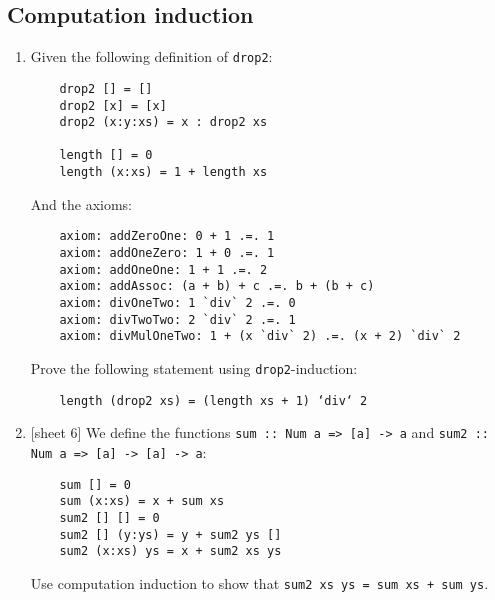 \documentclass{article}
\def\code#1{\texttt{#1}}
\begin{document}
\subsection{Computation induction}
\begin{enumerate}
    \item Given the following definition of \code{drop2}:
        \begin{verbatim}
    drop2 [] = []
    drop2 [x] = [x]
    drop2 (x:y:xs) = x : drop2 xs

    length [] = 0
    length (x:xs) = 1 + length xs
        \end{verbatim}
        And the axioms:
        \begin{verbatim}
    axiom: addZeroOne: 0 + 1 .=. 1
    axiom: addOneZero: 1 + 0 .=. 1
    axiom: addOneOne: 1 + 1 .=. 2
    axiom: addAssoc: (a + b) + c .=. b + (b + c)
    axiom: divOneTwo: 1 `div` 2 .=. 0
    axiom: divTwoTwo: 2 `div` 2 .=. 1
    axiom: divMulOneTwo: 1 + (x `div` 2) .=. (x + 2) `div` 2
        \end{verbatim}
        Prove the following statement using \code{drop2}-induction:
        \begin{verbatim}
    length (drop2 xs) = (length xs + 1) ‘div‘ 2
        \end{verbatim}

    \item {[sheet 6]} We define the functions \code{sum :: Num a => [a] -> a} and \code{sum2 :: Num a => [a] -> [a] -> a}:
        \begin{verbatim}
    sum [] = 0
    sum (x:xs) = x + sum xs
    sum2 [] [] = 0
    sum2 [] (y:ys) = y + sum2 ys []
    sum2 (x:xs) ys = x + sum2 xs ys
        \end{verbatim}
        Use computation induction to show that \code{sum2 xs ys = sum xs + sum ys}.
\end{enumerate}

\printbibliography
\end{document}
